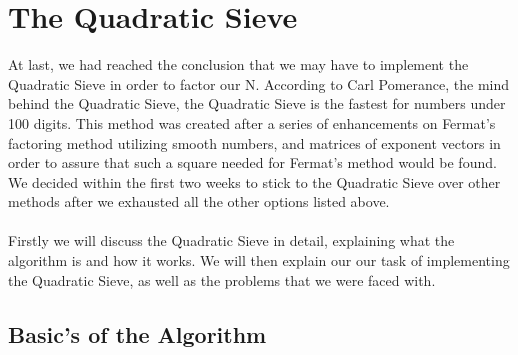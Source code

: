 \documentclass[12pt]{article} %
\begin{document}
	\section{The Quadratic Sieve}
	At last, we had reached the conclusion that we may have to implement the Quadratic Sieve in order to factor our N. According to Carl Pomerance, the mind behind the Quadratic Sieve, the Quadratic Sieve is the fastest for numbers under 100 digits\cite{pomerance}. This method was created after a series of enhancements on Fermat's factoring method utilizing smooth numbers, and matrices of exponent vectors in order to assure that such a square needed for Fermat's method would be found. We decided within the first two weeks to stick to the Quadratic Sieve over other methods after we exhausted all the other options listed above.
	\\\\
	Firstly we will discuss the Quadratic Sieve in detail, explaining what the algorithm is and how it works. We will then explain our our task of implementing the Quadratic Sieve, as well as the problems that we were faced with.
	\subsection{Basic's of the Algorithm}
	
\end{document}
